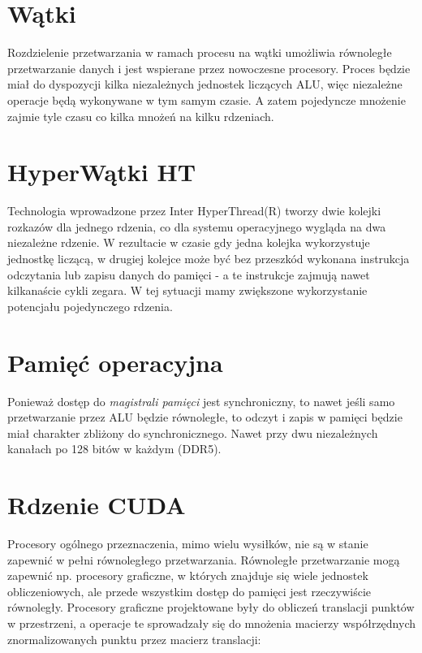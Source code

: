 \section{ Wątki }
Rozdzielenie przetwarzania w ramach procesu na wątki umożliwia równoległe przetwarzanie danych i jest wspierane przez nowoczesne procesory. Proces będzie miał do dyspozycji kilka niezależnych jednostek liczących ALU, więc niezależne operacje będą wykonywane w tym samym czasie. A zatem pojedyncze mnożenie zajmie tyle czasu co kilka mnożeń na kilku rdzeniach. 

\section{ HyperWątki HT}
Technologia wprowadzone przez Inter HyperThread(R) tworzy dwie kolejki rozkazów dla jednego rdzenia, co dla systemu operacyjnego wygląda na dwa niezależne rdzenie. W rezultacie w czasie gdy jedna kolejka wykorzystuje jednostkę liczącą, w drugiej kolejce może być bez przeszkód wykonana instrukcja odczytania lub zapisu danych do pamięci - a te instrukcje zajmują nawet kilkanaście cykli zegara. W tej sytuacji mamy zwiększone wykorzystanie potencjału pojedynczego rdzenia. 

\section{ Pamięć operacyjna }
Ponieważ dostęp do \textit{magistrali pamięci} jest synchroniczny, to nawet jeśli samo przetwarzanie przez ALU będzie równoległe, to odczyt i zapis w pamięci będzie miał charakter zbliżony do synchronicznego. Nawet przy dwu niezależnych kanałach po 128 bitów w każdym (DDR5). 

\section{ Rdzenie CUDA }
Procesory ogólnego przeznaczenia, mimo wielu wysiłków, nie są w stanie zapewnić w pełni równoległego przetwarzania. Równoległe przetwarzanie mogą zapewnić np. procesory graficzne, w których znajduje się wiele jednostek obliczeniowych, ale przede wszystkim dostęp do pamięci jest rzeczywiście równoległy. Procesory graficzne projektowane były do obliczeń translacji punktów w przestrzeni, a operacje te sprowadzały się do mnożenia macierzy współrzędnych znormalizowanych punktu przez macierz translacji:

